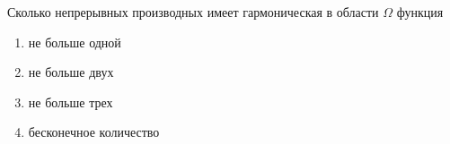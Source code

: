 Сколько непрерывных производных имеет гармоническая в области \(\Omega\) функция

\begin{enumerate}[label=\arabic*)]
    \item не больше одной
    \item не больше двух
    \item не больше трех
    \item бесконечное количество
\end{enumerate}

